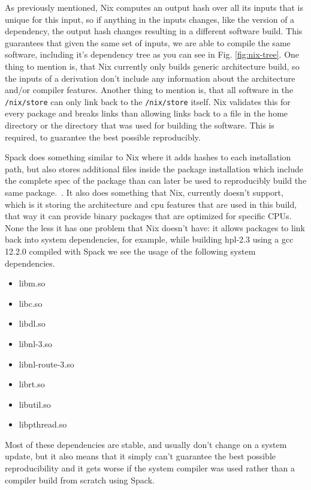 \documentclass[conference,final,a4paper]{IEEEtran}
\begin{document}
As previously mentioned, Nix computes an output hash over all its inputs that is unique for this input, so if anything in the inputs changes, like the version of a dependency, the output hash changes resulting in a different software build.
This guarantees that given the same set of inputs, we are able to compile the same software, including it's dependency tree as you can see in Fig. \ref{fig:nix-tree}.
One thing to mention is, that Nix currently only builds generic architecture build, so the inputs of a derivation don't include any information about the architecture and/or compiler features.
Another thing to mention is, that all software in the \texttt{/nix/store} can only link back to the \texttt{/nix/store} itself.
Nix validates this for every package and breaks links than allowing links back to a file in the home directory or the directory that was used for building the software.
This is required, to guarantee the best possible reproducibly.

Spack does something similar to Nix where it adds hashes to each installation path, but also stores additional files inside the package installation which include the complete spec of the package than can later be used to reproducibly build the same package.~\cite{Gamblin_2015}.
It also does something that Nix, currently doesn't support, which is it storing the architecture and cpu features that are used in this build, that way it can provide binary packages that are optimized for specific CPUs.
None the less it has one problem that Nix doesn't have: it allows packages to link back into system dependencies, for example, while building hpl-2.3 using a gcc 12.2.0 compiled with Spack we see the usage of the following system dependencies.
\begin{itemize}
  \item libm.so
  \item libc.so
  \item libdl.so
  \item libnl-3.so
  \item libnl-route-3.so
  \item librt.so
  \item libutil.so
  \item libpthread.so
\end{itemize}
Most of these dependencies are stable, and usually don't change on a system update, but it also means that it simply can't guarantee the best possible reproducibility and it gets worse if the system compiler was used rather than a compiler build from scratch using Spack.
\end{document}
